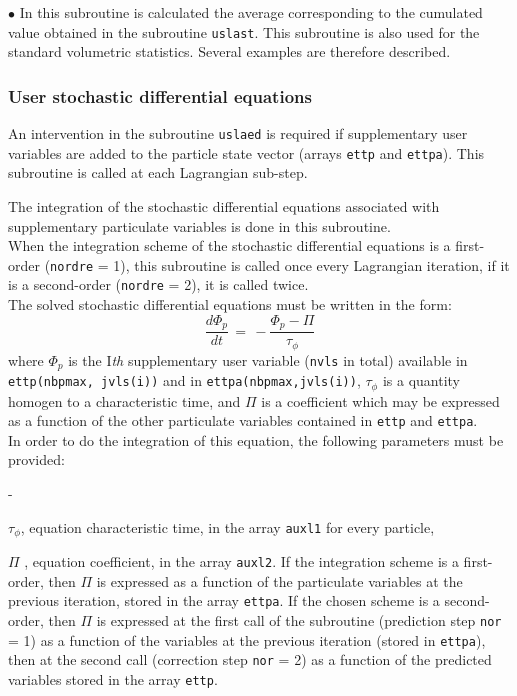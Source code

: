 {{{\begin{list}{$\bullet$}{}
\noindent
In this subroutine is calculated the average corresponding to the
cumulated value obtained in the subroutine \texttt{uslast}. This subroutine is
also used for the standard volumetric statistics. Several examples are
therefore described.
\end{list}

\subsubsection{User stochastic differential equations}

\noindent
An intervention in the subroutine \texttt{uslaed} is required if supplementary user
variables are added to the particle state vector (arrays \texttt{ettp}
and \texttt{ettpa}). This subroutine is called at each Lagrangian sub-step.

\noindent
The integration of the stochastic differential equations associated with
supplementary particulate variables is done in this subroutine. \\
When the integration scheme of the stochastic differential equations is
a first-order (\texttt{nordre} = 1), this subroutine is called once every
Lagrangian iteration, if it is a second-order (\texttt{nordre} = 2), it is called
twice. \\

\noindent
The solved stochastic differential equations must be written in the
form:
\begin{displaymath}
\frac{d \Phi_p}{dt} \,=\, - \frac{\Phi_p - \Pi}{\tau_\phi}
\end{displaymath}
where $\Phi_p$ is the I\textit{th} supplementary user variable (\texttt{nvls} in
total) available in \texttt{ettp(nbpmax, jvls(i))} and in
 \texttt{ettpa(nbpmax,jvls(i))},
$\tau_\phi$ is a quantity homogen to a characteristic time, and $\Pi$ is
a coefficient which may be expressed as a function of the other
particulate variables contained in \texttt{ettp} and \texttt{ettpa}. \\
In order to do the integration of this equation, the following
parameters must be provided:
\begin{list}{-}{}
\item $\tau_\phi$, equation characteristic time, in the array \texttt{auxl1} for
      every particle,
\item $\Pi$ , equation coefficient, in the array \texttt{auxl2}. If the
      integration scheme is a first-order, then $\Pi$ is expressed as a
      function of the particulate variables at the previous iteration,
      stored in the array \texttt{ettpa}. If the chosen scheme is a second-order,
      then $\Pi$ is expressed at the first call of the subroutine
      (prediction step \texttt{nor} = 1) as a function of the variables at the
      previous iteration (stored in \texttt{ettpa}), then at the second call
      (correction step \texttt{nor} = 2) as a function of the predicted variables
      stored in the array \texttt{ettp}.
\end{list}

}}}
